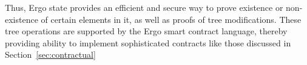 Thus, Ergo state provides an efficient and secure way to prove existence or non-existence of certain elements in
it, as well as proofs of tree modifications.
These tree operations are supported by the Ergo smart contract language, thereby providing ability to implement sophisticated contracts like those discussed in Section~\ref{sec:contractual}





